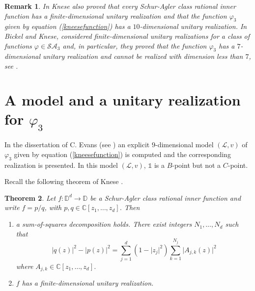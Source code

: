 \documentclass[11pt, reqno]{amsart}
\newtheorem{theorem}{Theorem}[section]
\newtheorem{remark}[theorem]{Remark}
\newcommand\1{\boldsymbol {1}}
\newcommand{\ph}{\varphi}
\numberwithin{equation}{section}
\begin{document}
\begin{remark}
\rm In \cite{Knese} Knese also proved that every Schur-Agler class rational inner function has a finite-dimensional unitary realization and that the function $\varphi_3$ given by equation (\ref{kneesefunction}) has a $10$-dimensional unitary realization. In \cite{Bickel-Knese}  Bickel and Knese, considered finite-dimensional unitary realizations for a class of functions $\varphi \in\mathcal{SA}_{3}$ and, in particular, they proved that the function $\varphi_3$ has a $7$-dimensional unitary realization and cannot be realized with dimension less than $7$, see \cite[Theorem 1.12]{Bickel-Knese}. 
\end{remark}


\section{A model and a unitary realization for $\varphi_3$}\label{model3}
In the dissertation of C. Evans (see \cite[Sections 7.3, 7.4]{Evans}) an explicit $9$-dimensional model $(\mathcal{L},v)$ of $\ph_3$ given by equation (\ref{kneesefunction}) is computed and the corresponding realization is presented. In this model $(\mathcal{L},v)$, $\mathds{1}$ is a $B$-point but not a $C$-point.

Recall the following theorem of  Knese \cite{Knese}.

\begin{theorem}{}\label{kneseresultunitary}
    Let $f:\mathbb{D}^{d}\rightarrow \mathbb{D}$ be a Schur-Agler class rational inner function and write $f=p/q$, with $p,q\in\mathbb{C}[z_{1},\hdots,z_{d}]$.  Then
    \begin{enumerate}
        \item a sum-of-squares decomposition holds. There exist integers $N_{1},\hdots,N_{d}$ such that
        $$\lvert q(z)\rvert^{2} - \lvert p(z)\rvert^{2} = \sum_{j=1}^{d}(1-\lvert z_{j}\rvert^{2})\sum_{k=1}^{N_{j}}\lvert A_{j,k}(z)\rvert^{2}$$
    where $A_{j,k}\in\mathbb{C}[z_{1},\hdots,z_{d}]$.
    \item $f$ has a finite-dimensional unitary realization.
    \end{enumerate}   
\end{theorem}
\end{document}
